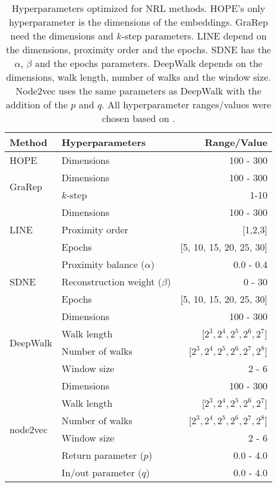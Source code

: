 \begin{table}[ht!]
    \centering
    \begin{tabular}{ |l|l|r| }
        \hline
        \textbf{Method} & \textbf{Hyperparameters} & \textbf{Range/Value} \\
        \hline
        HOPE & Dimensions & 100 - 300 \\
        \hline
        \multirow{2}{5em}{GraRep} & Dimensions & 100 - 300 \\
            & $k$-step & 1-10 \\
        \hline
        \multirow{3}{4em}{LINE} & Dimensions & 100 - 300 \\
            & Proximity order & [1,2,3] \\
            & Epochs & [5, 10, 15, 20, 25, 30] \\
        \hline
        \multirow{3}{5em}{SDNE} & Proximity balance ($\alpha$) & 0.0 - 0.4 \\
            & Reconstruction weight ($\beta$) & 0 - 30 \\
            & Epochs & [5, 10, 15, 20, 25, 30] \\
        \hline
        \multirow{4}{5em}{DeepWalk} & Dimensions & 100 - 300 \\
            & Walk length & [$2^3, 2^4, 2^5, 2^6, 2^7$] \\
            & Number of walks & [$2^3, 2^4, 2^5, 2^6, 2^7, 2^8$] \\
            & Window size & 2 - 6 \\
        \hline
        \multirow{6}{5em}{node2vec} & Dimensions & 100 - 300 \\
            & Walk length & [$2^3, 2^4, 2^5, 2^6, 2^7$] \\
            & Number of walks & [$2^3, 2^4, 2^5, 2^6, 2^7, 2^8$] \\
            & Window size & 2 - 6 \\
            & Return parameter ($p$) & 0.0 - 4.0 \\
            & In/out parameter ($q$) & 0.0 - 4.0 \\
        \hline
    \end{tabular}
    \caption[Hyperparameters optimized for network representation learning methods]{Hyperparameters optimized for \ac{NRL} methods. HOPE's only hyperparameter is the dimensions of the embeddings. GraRep need the dimensions and $k$-step parameters. LINE depend on the dimensions, proximity order and the epochs. SDNE has the $\alpha$, $\beta$ and the epochs parameters. DeepWalk depends on the dimensions, walk length, number of walks and the window size. Node2vec uses the same parameters as DeepWalk with the addition of the $p$ and $q$. All hyperparameter ranges/values were chosen based on \cite{yue_graph_2019}.}
    \label{tab:hyperparameters}
\end{table}

